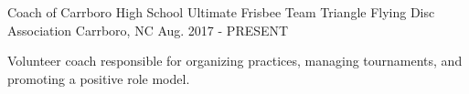

\begin{cventries}

  \cventry
    {Coach of Carrboro High School Ultimate Frisbee Team} %
    {Triangle Flying Disc Association} %
    {Carrboro, NC} %
    {Aug. 2017 - PRESENT} %
    {
      \begin{cvitems} %
        \item {Volunteer coach responsible for organizing practices, managing tournaments, and promoting a positive role model.}
      \end{cvitems}
    }

\end{cventries}
